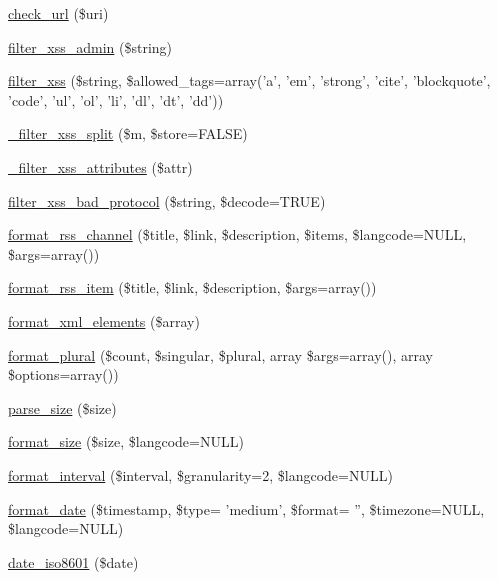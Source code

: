 \begin{DoxyCompactItemize}
\item 
\hyperlink{group__sanitization_gac024315b69035ef05c33674838707919}{check\_\-url} (\$uri)
\item 
\hyperlink{group__sanitization_ga97dcceb77b76539219af2a85eacbe18d}{filter\_\-xss\_\-admin} (\$string)
\item 
\hyperlink{group__sanitization_ga8864a29ffa8de5c9f8dc9e417060660d}{filter\_\-xss} (\$string, \$allowed\_\-tags=array('a', 'em', 'strong', 'cite', 'blockquote', 'code', 'ul', 'ol', 'li', 'dl', 'dt', 'dd'))
\item 
\hyperlink{group__sanitization_ga1cc6cca885f021adcf11970b8ec4c846}{\_\-filter\_\-xss\_\-split} (\$m, \$store=FALSE)
\item 
\hyperlink{group__sanitization_ga3c24df8bdf07aa972dd82aa2ab35858f}{\_\-filter\_\-xss\_\-attributes} (\$attr)
\item 
\hyperlink{group__sanitization_ga81affabdadf9d999874d5a69316ec8c8}{filter\_\-xss\_\-bad\_\-protocol} (\$string, \$decode=TRUE)
\item 
\hyperlink{group__format_ga44992b971aed4a6a5b8457678f57de50}{format\_\-rss\_\-channel} (\$title, \$link, \$description, \$items, \$langcode=NULL, \$args=array())
\item 
\hyperlink{group__format_ga4ecc9b876a9eaa65abb24ef513b217ad}{format\_\-rss\_\-item} (\$title, \$link, \$description, \$args=array())
\item 
\hyperlink{group__format_gafb344c648e6b63c35950d2889430e4c7}{format\_\-xml\_\-elements} (\$array)
\item 
\hyperlink{group__format_ga215a60b10cd70858e7a268eaf04cbed7}{format\_\-plural} (\$count, \$singular, \$plural, array \$args=array(), array \$options=array())
\item 
\hyperlink{group__format_ga08382023ada29bae2a6a94f22196b066}{parse\_\-size} (\$size)
\item 
\hyperlink{group__format_ga2a0075e7646fa2f399286272faa2956e}{format\_\-size} (\$size, \$langcode=NULL)
\item 
\hyperlink{group__format_ga0615263857988e35c25d84c59a9733a4}{format\_\-interval} (\$interval, \$granularity=2, \$langcode=NULL)
\item 
\hyperlink{group__format_ga40553742a67f9c79c4669b9053fe202c}{format\_\-date} (\$timestamp, \$type= 'medium', \$format= '', \$timezone=NULL, \$langcode=NULL)
\item 
\hyperlink{group__format_gabb13004721c9ab696704c968887d9d79}{date\_\-iso8601} (\$date)
\item 

\end{DoxyCompactItemize}
